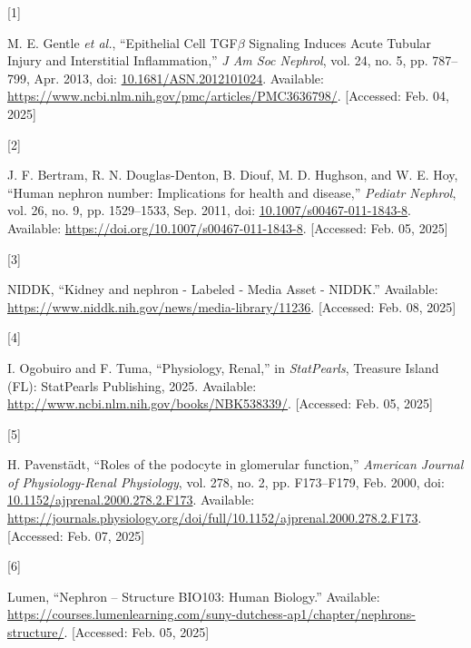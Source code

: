 \documentclass[
  paper=a4,
  ,captions=tableheading
]{scrartcl}
\newlength{\cslhangindent}
\newlength{\csllabelwidth}
\newenvironment{CSLReferences}[2] %
  {\begin{list}{}{%
   \setlength{\itemindent}{0pt}
   \setlength{\leftmargin}{0pt}
   \setlength{\parsep}{0pt}
   \ifodd #1
    \setlength{\leftmargin}{\cslhangindent}
    \setlength{\itemindent}{-1\cslhangindent}
   \fi
   \setlength{\itemsep}{#2\baselineskip}}}
  {\end{list}}
\newcommand{\CSLLeftMargin}[1]{\parbox[t]{\csllabelwidth}{\strut#1\strut}}
\newcommand{\CSLRightInline}[1]{\parbox[t]{\linewidth - \csllabelwidth}{\strut#1\strut}}
\begin{document}
\protect{}\label{refs}
\begin{CSLReferences}{0}{0}
\CSLLeftMargin{{[}1{]} }%
\CSLRightInline{M. E. Gentle \emph{et al.}, {``Epithelial {Cell TGF\(\beta\)
Signaling Induces Acute Tubular Injury} and {Interstitial
Inflammation},''} \emph{J Am Soc Nephrol}, vol. 24, no. 5, pp. 787--799,
Apr. 2013, doi:
\href{https://doi.org/10.1681/ASN.2012101024}{10.1681/ASN.2012101024}.
Available: \url{https://www.ncbi.nlm.nih.gov/pmc/articles/PMC3636798/}.
{[}Accessed: Feb. 04, 2025{]}}

\CSLLeftMargin{{[}2{]} }%
\CSLRightInline{J. F. Bertram, R. N. Douglas-Denton, B. Diouf, M. D.
Hughson, and W. E. Hoy, {``Human nephron number: Implications for health
and disease,''} \emph{Pediatr Nephrol}, vol. 26, no. 9, pp. 1529--1533,
Sep. 2011, doi:
\href{https://doi.org/10.1007/s00467-011-1843-8}{10.1007/s00467-011-1843-8}.
Available: \url{https://doi.org/10.1007/s00467-011-1843-8}. {[}Accessed:
Feb. 05, 2025{]}}

\CSLLeftMargin{{[}3{]} }%
\CSLRightInline{NIDDK, {``Kidney and nephron - {Labeled} - {Media Asset}
- {NIDDK}.''} Available:
\url{https://www.niddk.nih.gov/news/media-library/11236}. {[}Accessed:
Feb. 08, 2025{]}}

\CSLLeftMargin{{[}4{]} }%
\CSLRightInline{I. Ogobuiro and F. Tuma, {``Physiology, {Renal},''} in
\emph{{StatPearls}}, Treasure Island (FL): StatPearls Publishing, 2025.
Available: \url{http://www.ncbi.nlm.nih.gov/books/NBK538339/}.
{[}Accessed: Feb. 05, 2025{]}}

\CSLLeftMargin{{[}5{]} }%
\CSLRightInline{H. Pavenstädt, {``Roles of the podocyte in glomerular
function,''} \emph{American Journal of Physiology-Renal Physiology},
vol. 278, no. 2, pp. F173--F179, Feb. 2000, doi:
\href{https://doi.org/10.1152/ajprenal.2000.278.2.F173}{10.1152/ajprenal.2000.278.2.F173}.
Available:
\url{https://journals.physiology.org/doi/full/10.1152/ajprenal.2000.278.2.F173}.
{[}Accessed: Feb. 07, 2025{]}}

\CSLLeftMargin{{[}6{]} }%
\CSLRightInline{Lumen, {``Nephron -- {Structure} \textbar{} {BIO103}:
{Human Biology}.''} Available:
\url{https://courses.lumenlearning.com/suny-dutchess-ap1/chapter/nephrons-structure/}.
{[}Accessed: Feb. 05, 2025{]}}


\end{CSLReferences}
\end{document}
